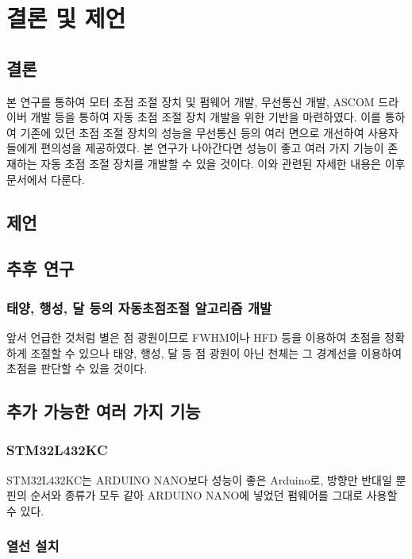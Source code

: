 \section{결론 및 제언}
	
\subsection{결론}

 본 연구를 통하여 모터 초점 조절 장치 및 펌웨어 개발, 무선통신 개발, ASCOM 드라이버 개발 등을 통하여 자동 초점 조절 장치 개발을 위한 기반을 마련하였다. 이를 통하여 기존에 있던 초점 조절 장치의 성능을 무선통신 등의 여러 면으로 개선하여 사용자들에게 편의성을 제공하였다. 본 연구가 나아간다면 성능이 좋고 여러 가지 기능이 존재하는 자동 초점 조절 장치를 개발할 수 있을 것이다. 이와 관련된 자세한 내용은 이후 문서에서 다룬다.


\subsection{제언}



\subsection{추후 연구}


\subsubsection{태양, 행성, 달 등의 자동초점조절 알고리즘 개발}

앞서 언급한 것처럼 별은 점 광원이므로 FWHM이나 HFD 등을 이용하여 초점을 정확하게 조절할 수 있으나 태양, 행성, 달 등 점 광원이 아닌 천체는 그 경계선을 이용하여 초점을 판단할 수 있을 것이다. 


\subsection{추가 가능한 여러 가지 기능}

\subsubsection{STM32L432KC}

STM32L432KC는 ARDUINO NANO보다 성능이 좋은 Arduino로, 방향만 반대일 뿐 핀의 순서와 종류가 모두 같아 ARDUINO NANO에 넣었던 펌웨어를 그대로 사용할 수 있다.

\subsubsection{열선 설치}

